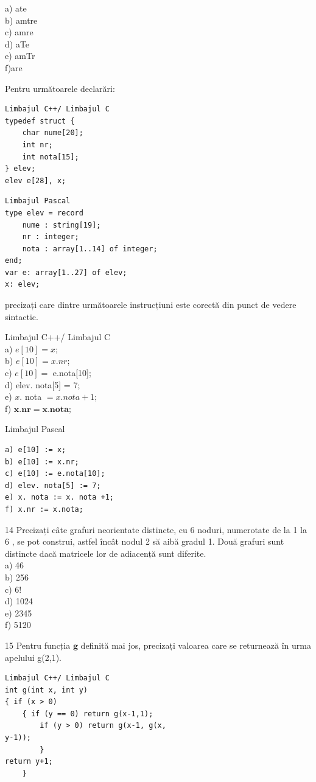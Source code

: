 \documentclass[10pt]{article}
\begin{document}
a) ate\\
b) amtre\\
c) amre\\
d) aTe\\
e) amTr\\
f)are

Pentru următoarele declarări:

\begin{verbatim}
Limbajul C++/ Limbajul C
typedef struct {
    char nume[20];
    int nr;
    int nota[15];
} elev;
elev e[28], x;
\end{verbatim}

\begin{verbatim}
Limbajul Pascal
type elev = record
    nume : string[19];
    nr : integer;
    nota : array[1..14] of integer;
end;
var e: array[1..27] of elev;
x: elev;
\end{verbatim}

precizați care dintre următoarele instrucțiuni este corectă din punct de vedere sintactic.

Limbajul C++/ Limbajul C\\
a) $e[10]=x$;\\
b) $e[10]=x . n r$;\\
c) $e[10]=$ e.nota[10];\\[0pt]
d) elev. nota[5] = 7;\\
e) $x$. nota $=x . n o t a+1$;\\
f) $\mathbf{x . n r = x . n o t a ; ~}$

Limbajul Pascal

\begin{verbatim}
a) e[10] := x;
b) e[10] := x.nr;
c) e[10] := e.nota[10];
d) elev. nota[5] := 7;
e) x. nota := x. nota +1;
f) x.nr := x.nota;
\end{verbatim}

14 Precizați câte grafuri neorientate distincte, cu 6 noduri, numerotate de la 1 la 6 , se pot construi, astfel încât nodul 2 să aibă gradul 1. Două grafuri sunt distincte dacă matricele lor de adiacență sunt diferite.\\
a) 46\\
b) 256\\
c) $6!$\\
d) 1024\\
e) 2345\\
f) 5120

15 Pentru funcția $\mathbf{g}$ definită mai jos, precizați valoarea care se returnează în urma apelului g(2,1).

\begin{verbatim}
Limbajul C++/ Limbajul C
int g(int x, int y)
{ if (x > 0)
    { if (y == 0) return g(x-1,1);
        if (y > 0) return g(x-1, g(x,
y-1));
        }
return y+1;
    }
\end{verbatim}
\end{document}
